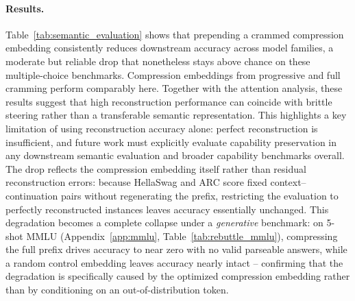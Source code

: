 \documentclass{article}
\theoremstyle{plain}
\theoremstyle{definition}
\theoremstyle{remark}
\begin{document}
\paragraph{Results.}
\begin{table}[t]
    \centering
    \caption{Downstream multiple-choice evaluation on HellaSwag and ARC-Easy (4-way; chance = 25\%). ``Base'' uses the original prefix and is evaluated on all samples. For each cramming variant (Progressive, Full), ``Acc'' reports accuracy over the converged subset only and ``Conv\%'' reports the fraction of samples that fully converged. A sample is fully converged when its per-token argmax match rate equals $1.0$ (token-perfect reconstruction). Empty cells (``--'') indicate that the corresponding run does not exist or has zero converged samples (denominator $0$).}
    \label{tab:semantic_evaluation}

    \begin{small}
    
    \end{small}

\end{table}

Table~\ref{tab:semantic_evaluation} shows that prepending a crammed compression embedding consistently reduces downstream accuracy across model families, a moderate but reliable drop that nonetheless stays above chance on these multiple-choice benchmarks. Compression embeddings from progressive and full cramming perform comparably here.
Together with the attention analysis, these results suggest that high reconstruction performance can coincide with brittle steering rather than a transferable semantic representation.
This highlights a key limitation of using reconstruction accuracy alone: perfect reconstruction is insufficient, and future work must explicitly evaluate capability preservation in any downstream semantic evaluation and broader capability benchmarks overall.
The drop reflects the compression embedding itself rather than residual reconstruction errors: because HellaSwag and ARC score fixed context--continuation pairs without regenerating the prefix, restricting the evaluation to perfectly reconstructed instances leaves accuracy essentially unchanged.
This degradation becomes a complete collapse under a \emph{generative} benchmark: on 5-shot MMLU (Appendix~\ref{app:mmlu}, Table~\ref{tab:rebuttle_mmlu}), compressing the full prefix drives accuracy to near zero with no valid parseable answers, while a random control embedding leaves accuracy nearly intact -- confirming that the degradation is specifically caused by the optimized compression embedding rather than by conditioning on an out-of-distribution token.
\end{document}
